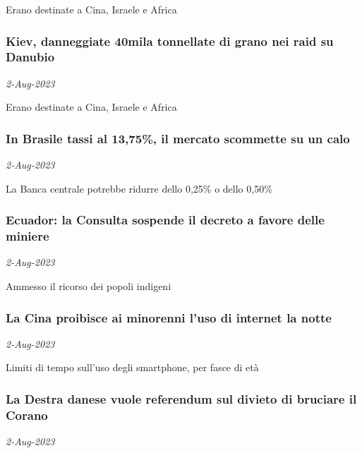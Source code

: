 Erano destinate a Cina, Israele e Africa
\subsubsection{Kiev, danneggiate 40mila tonnellate di grano nei raid su Danubio \href{https://www.ansa.it/sito/notizie/mondo/europa/2023/08/02/kiev-danneggiate-40mila-tonnellate-di-grano-nei-raid-su-danubio_6cceaee8-5a90-4058-ac09-da31a493d1db.html}{}}
\textit{2-Aug-2023}

Erano destinate a Cina, Israele e Africa
\subsubsection{In Brasile tassi al 13,75\%, il mercato scommette su un calo \href{https://www.ansa.it/sito/notizie/mondo/americalatina/2023/08/02/in-brasile-tassi-al-1375-il-mercato-scommette-su-un-calo_7dc4fb4f-29f1-4cdc-8e06-af47e818526e.html}{}}
\textit{2-Aug-2023}

La Banca centrale potrebbe ridurre dello 0,25\% o dello 0,50\%
\subsubsection{Ecuador: la Consulta sospende il decreto a favore delle miniere \href{https://www.ansa.it/sito/notizie/mondo/americalatina/2023/08/02/ecuador-la-consulta-sospende-il-decreto-a-favore-delle-miniere_879c7c6a-c122-4bd6-aa2b-548efda75d75.html}{}}
\textit{2-Aug-2023}

Ammesso il ricorso dei popoli indigeni
\subsubsection{La Cina proibisce ai minorenni l'uso di internet la notte \href{https://www.ansa.it/sito/notizie/mondo/asia/2023/08/02/la-cina-proibisce-ai-minorenni-luso-di-internet-la-notte_03a7bac9-9615-4704-90b3-c40aed97e878.html}{}}
\textit{2-Aug-2023}

Limiti di tempo sull'uso degli smartphone, per fasce di et\`{a}
\subsubsection{La Destra danese vuole referendum sul divieto di bruciare il Corano \href{https://www.ansa.it/sito/notizie/mondo/europa/2023/08/02/destra-danese-vuole-referendum-sul-divieto-di-bruciare-il-corano_37b2c7d6-2757-4bbf-8175-12daf9306dfb.html}{}}
\textit{2-Aug-2023}

